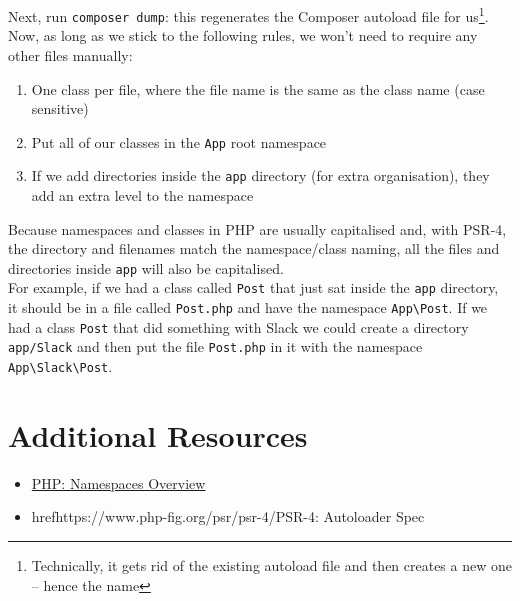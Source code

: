 Next, run \texttt{composer dump}: this regenerates the Composer autoload file for us\footnote{Technically, it gets rid of the existing autoload file and then creates a new one – hence the name}.
\\

Now, as long as we stick to the following rules, we won't need to require any other files manually:

\begin{enumerate}
    \item One class per file, where the file name is the same as the class name (case sensitive)
    \item Put all of our classes in the \texttt{App} root namespace
    \item If we add directories inside the \texttt{app} directory (for extra organisation), they add an extra level to the namespace
\end{enumerate}

Because namespaces and classes in PHP are usually capitalised and, with PSR-4, the directory and filenames match the namespace/class naming, all the files and directories inside \texttt{app} will also be capitalised.
\\

For example, if we had a class called \texttt{Post} that just sat inside the \texttt{app} directory, it should be in a file called \texttt{Post.php} and have the namespace \texttt{App\textbackslash Post}. If we had a class \texttt{Post} that did something with Slack we could create a directory \texttt{app/Slack} and then put the file \texttt{Post.php} in it with the namespace \texttt{App\textbackslash Slack\textbackslash Post}.


\section{Additional Resources}

\begin{itemize}[leftmargin=*]
    \item \href{http://www.php.net/manual/en/language.namespaces.rationale.php}{PHP: Namespaces Overview}
    \item href{https://www.php-fig.org/psr/psr-4/}{PSR-4: Autoloader Spec}
\end{itemize}
